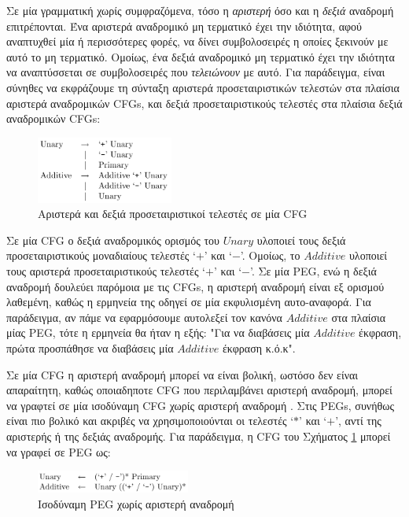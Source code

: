\documentclass[diploma]{softlab-thesis}
\begin{document}
Σε μία γραμματική χωρίς συμφραζόμενα, τόσο η \textit{αριστερή} όσο και η \textit{δεξιά} αναδρομή επιτρέπονται. 
Ένα αριστερά αναδρομικό μη τερματικό έχει την ιδιότητα, αφού αναπτυχθεί μία ή περισσότερες φορές, να δίνει συμβολοσειρές η οποίες ξεκινούν με αυτό το μη τερματικό. 
Ομοίως, ένα δεξιά αναδρομικό μη τερματικό έχει την ιδιότητα να αναπτύσσεται σε συμβολοσειρές που \textit{τελειώνουν} με αυτό. 
Για παράδειγμα, είναι σύνηθες να εκφράζουμε τη σύνταξη αριστερά προσεταιριστικών τελεστών στα πλαίσια αριστερά αναδρομικών CFGs, και δεξιά προσεταιριστικούς τελεστές στα πλαίσια δεξιά αναδρομικών CFGs:

\begin{figure}[h]
    \centering
	\includegraphics[width=0.40\textwidth]{pics/left_recursion}
	\caption{Αριστερά και δεξιά προσεταιριστικοί τελεστές σε μία CFG}
    \label{fig:left_recursion}
\end{figure}

Σε μία CFG ο δεξιά αναδρομικός ορισμός του $Unary$ υλοποιεί τους δεξιά προσεταιριστικούς μοναδιαίους τελεστές `$+$' και `$-$'.
Ομοίως, το $Additive$ υλοποιεί τους αριστερά προσεταιριστικούς τελεστές `$+$' και `$-$'.
Σε μία PEG, ενώ η δεξιά αναδρομή δουλεύει παρόμοια με τις CFGs, η αριστερή αναδρομή είναι εξ ορισμού λαθεμένη, καθώς η ερμηνεία της οδηγεί σε μία εκφυλισμένη αυτο-αναφορά. 
Για παράδειγμα, αν πάμε να εφαρμόσουμε αυτολεξεί τον κανόνα $Additive$ στα πλαίσια μίας PEG, τότε η ερμηνεία θα ήταν η εξής:
"Για να διαβάσεις μία $Additive$ έκφραση, πρώτα προσπάθησε να διαβάσεις μία $Additive$ έκφραση κ.ό.κ".

Σε μία CFG η αριστερή αναδρομή μπορεί να είναι βολική, ωστόσο δεν είναι απαραίτητη, καθώς οποιαδηποτε CFG που περιλαμβάνει αριστερή αναδρομή, μπορεί να γραφτεί σε μία ισοδύναμη CFG χωρίς αριστερή αναδρομή \cite{Moore2000}. 
Στις PEGs, συνήθως είναι πιο βολικό και ακριβές να χρησιμοποιούνται οι τελεστές `$*$' και `$+$', αντί της αριστερής ή της δεξιάς αναδρομής. 
Για παράδειγμα, η CFG του Σχήματος \ref{fig:left_recursion} μπορεί να γραφεί σε PEG ως:

\begin{figure}[h]
    \centering
	\includegraphics[width=0.45\textwidth]{pics/left_recursion_fix}
	\caption{Ισοδύναμη PEG χωρίς αριστερή αναδρομή}
    \label{fig:left_recursion_fix}
\end{figure}
\end{document}
